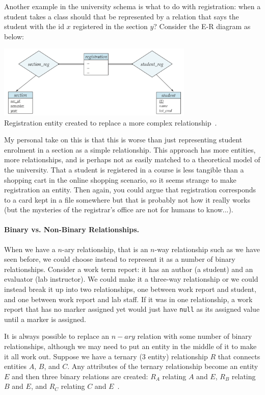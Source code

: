 Another example in the university schema is what to do with registration: when a student takes a class should that be represented by a relation that says the student with the id $x$ registered in the section $y$? Consider the E-R diagram as below:

\begin{center}
	\includegraphics[width=0.7\textwidth]{images/reg-split}\\
	Registration entity created to replace a more complex relationship~\cite{dsc}.
\end{center}

My personal take on this is that this is worse than just representing student enrolment in a section as a simple relationship. This approach has more entities, more relationships, and is perhaps not as easily matched to a theoretical model of the university. That a student is registered in a course is less tangible than a shopping cart in the online shopping scenario, so it seems strange to make registration an entity. Then again, you could argue that registration corresponds to a card kept in a file somewhere but that is probably not how it really works (but the mysteries of the registrar's office are not for humans to know...).

\paragraph{Binary vs. Non-Binary Relationships.}
When we have a $n$-ary relationship, that is an $n$-way relationship such as we have seen before, we could choose instead to represent it as a number of binary relationships. Consider a work term report: it has an author (a student) and an evaluator (lab instructor). We could make it a three-way relationship or we could instead break it up into two relationships, one between work report and student, and one between work report and lab staff. If it was in one relationship, a work report that has no marker assigned yet would just have \texttt{null} as its assigned value until a marker is assigned.  

It is always possible to replace an $n-ary$ relation with some number of binary relationships, although we may need to put an entity in the middle of it to make it all work out. Suppose we have a ternary (3 entity) relationship $R$ that connects entities $A$, $B$, and $C$. Any attributes of the ternary relationship become an entity $E$ and then three binary relations are created: $R_{A}$ relating $A$ and $E$, $R_{B}$ relating $B$ and $E$, and $R_{C}$ relating $C$ and $E$~\cite{dsc}.

